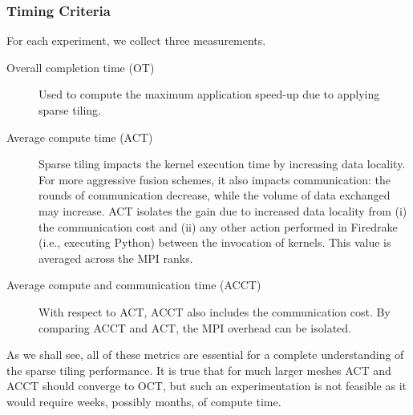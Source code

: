 \subsubsection{Timing Criteria}
For each experiment, we collect three measurements.

\begin{description}
\item[Overall completion time (OT)] Used to compute the maximum application speed-up due to applying sparse tiling. 
\item[Average compute time (ACT)] Sparse tiling impacts the kernel execution time by increasing data locality. For more aggressive fusion schemes, it also impacts communication: the rounds of communication decrease, while the volume of data exchanged may increase. ACT isolates the gain due to increased data locality from (i) the communication cost and (ii) any other action performed in Firedrake (i.e., executing Python) between the invocation of kernels. This value is averaged across the MPI ranks.
\item[Average compute and communication time (ACCT)] With respect to ACT, ACCT also includes the communication cost. By comparing ACCT and ACT, the MPI overhead can be isolated. 
\end{description}
As we shall see, all of these metrics are essential for a complete understanding of the sparse tiling performance. It is true that for much larger meshes ACT and ACCT should converge to OCT, but such an experimentation is not feasible as it would require weeks, possibly months, of compute time.

